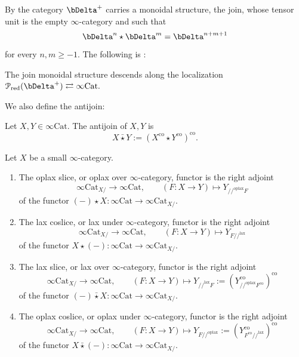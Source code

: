 \documentclass[10pt,oneside]{article}
\numberwithin{equation}{section} %
\numberwithin{figure}{section} %
\theoremstyle{plain}
\theoremstyle{definition}
\newcommand{\mP}{{\mathcal P}}
\newcommand{\X}{X}
\newcommand{\co}{\mathrm{co}}
\newcommand{\Cat}{\mathrm{Cat}}
\newcommand{\lax}{{\mathrm{lax}}}
\newcommand{\oplax}{{\mathrm{oplax}}}
\begin{document}
By \cite[Definition 2.6.30]{GepnerHeine2026} the category $\bDelta^+$ carries a monoidal structure, the join,
whose tensor unit is the empty $\infty$-category and such that $$\bDelta^n \star \bDelta^m = \bDelta^{n+m+1}$$ for every $n,m \geq -1.$
The following is \cite[Corollary 3.5.8.]{GepnerHeine2026}:

\begin{theorem}\label{locmon4}

The join monoidal structure descends along the localization $\mP_{\mathrm{red}}(\bDelta^+) \rightleftarrows \infty\Cat. $

\end{theorem} 


We also define the antijoin:

\begin{definition}
Let $X, Y \in \infty\Cat.$ The antijoin of $X, Y$ is
$$X \bar{\star} Y := (X^{\co} \star Y^{\co})^{\co} .$$

\end{definition}

\begin{definition}Let $X$ be a small $\infty$-category.
\begin{enumerate}[\normalfont(1)]\setlength{\itemsep}{-2pt}
\item The oplax slice, or oplax over $\infty$-category, functor is the right adjoint $$ \infty\Cat_{X/ } \to \infty\Cat, \qquad (F:X \to Y) \mapsto Y_{//^\oplax F}$$ of the functor $ (-) \star X: \infty\Cat \to \infty\Cat_{X/ }.$

\item The lax coslice, or lax under $\infty$-category, functor is the right adjoint $$ \infty\Cat_{X/ } \to \infty\Cat,\qquad (F:X \to Y) \mapsto Y_{F//^\lax }$$ of the functor $ X \star (-): \infty\Cat \to \infty\Cat_{\X / }.$

\item The lax slice, or lax over $\infty$-category, functor is the right adjoint $$ \infty\Cat_{\X / } \to \infty\Cat,\qquad (F:X \to Y) \mapsto Y_{//^\lax F} := (Y^\co_{//^\oplax F^\co})^\co $$
of the functor $ (-) \bar{\star} X: \infty\Cat \to \infty\Cat_{X/ }.$

\item The oplax coslice, or oplax under $\infty$-category, functor is the right adjoint $$ \infty\Cat_{X/ } \to \infty\Cat,\qquad (F:X \to Y) \mapsto Y_{F//^\oplax}:=(Y^\co_{F^\co//^\lax })^\co $$
of the functor $ X \bar{\star} (-): \infty\Cat \to \infty\Cat_{\X / }.$

\end{enumerate}

\end{definition}
\end{document}

